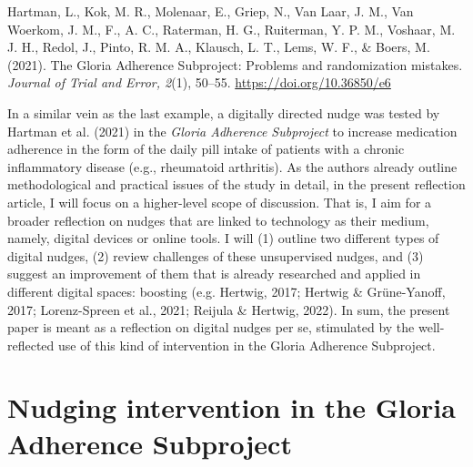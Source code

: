 \documentclass[reflection, authordate,issue]{jote-new-article}
\begin{document}


\begin{companion}
Hartman, L., Kok, M. R., Molenaar, E., Griep, N., Van Laar, J. M., Van Woerkom, J. M., F., A. C., Raterman, H. G., Ruiterman, Y. P. M., Voshaar, M. J. H., Redol, J., Pinto, R. M. A., Klausch, L. T., Lems, W. F., \& Boers, M. (2021). The Gloria Adherence Subproject: Problems and randomization mistakes. \emph{Journal of Trial and Error, 2}(1), 50–55. \url{https://doi.org/10.36850/e6}
\end{companion}

In a similar vein as the last example, a digitally directed nudge was tested by Hartman et al. (2021) in the \emph{Gloria Adherence Subproject} to increase medication adherence in the form of the daily pill intake of patients with a chronic inflammatory disease (e.g., rheumatoid arthritis). As the authors already outline methodological and practical issues of the study in detail, in the present reflection article, I will focus on a higher-level scope of discussion. That is, I aim for a broader reflection on nudges that are linked to technology as their medium, namely, digital devices or online tools. I will (1) outline two different types of digital nudges, (2) review challenges of these unsupervised nudges, and (3) suggest an improvement of them that is already researched and applied in different digital spaces: boosting  (e.g. Hertwig, 2017; Hertwig \& Grüne-Yanoff, 2017; Lorenz-Spreen et al., 2021; Reijula \& Hertwig, 2022). In sum, the present paper is meant as a reflection on digital nudges per se, stimulated by the well-reflected use of this kind of intervention in the Gloria Adherence Subproject.



\section{Nudging intervention in the Gloria Adherence Subproject}
\end{document}
